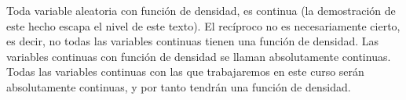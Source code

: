 \documentclass{ximera}
\begin{document}

\lipsum[1]

\begin{thm}[título]
	Toda variable aleatoria con función de densidad, es continua (la demostración de este hecho escapa el nivel de este texto). El recíproco no es necesariamente cierto, es decir, no todas las variables continuas tienen una función de densidad. Las variables continuas con función de densidad se llaman absolutamente continuas. Todas las variables continuas con las que trabajaremos en este curso serán absolutamente continuas, y por tanto tendrán una función de densidad. 
\end{thm}

\lipsum[1]


\begin{prp}
	\lipsum[1]
\end{prp}

\end{document}
